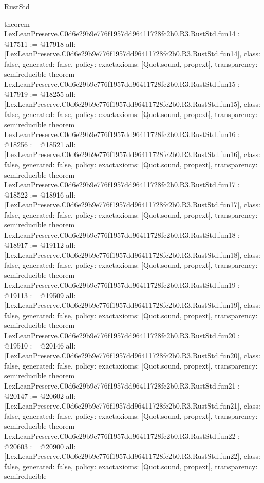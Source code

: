 \begin{lexlean}{RustStd}
\begin{coremodule}
{}
theorem LexLeanPreserve.C0d6e29b9e776f1957dd96411728fc2b0.R3.RustStd.fun14 : @17511 := @17918 {
  all: [LexLeanPreserve.C0d6e29b9e776f1957dd96411728fc2b0.R3.RustStd.fun14],
  class: false,
  generated: false,
  policy: exact{axioms: [Quot.sound, propext]},
  transparency: semireducible
}
theorem LexLeanPreserve.C0d6e29b9e776f1957dd96411728fc2b0.R3.RustStd.fun15 : @17919 := @18255 {
  all: [LexLeanPreserve.C0d6e29b9e776f1957dd96411728fc2b0.R3.RustStd.fun15],
  class: false,
  generated: false,
  policy: exact{axioms: [Quot.sound, propext]},
  transparency: semireducible
}
theorem LexLeanPreserve.C0d6e29b9e776f1957dd96411728fc2b0.R3.RustStd.fun16 : @18256 := @18521 {
  all: [LexLeanPreserve.C0d6e29b9e776f1957dd96411728fc2b0.R3.RustStd.fun16],
  class: false,
  generated: false,
  policy: exact{axioms: [Quot.sound, propext]},
  transparency: semireducible
}
theorem LexLeanPreserve.C0d6e29b9e776f1957dd96411728fc2b0.R3.RustStd.fun17 : @18522 := @18916 {
  all: [LexLeanPreserve.C0d6e29b9e776f1957dd96411728fc2b0.R3.RustStd.fun17],
  class: false,
  generated: false,
  policy: exact{axioms: [Quot.sound, propext]},
  transparency: semireducible
}
theorem LexLeanPreserve.C0d6e29b9e776f1957dd96411728fc2b0.R3.RustStd.fun18 : @18917 := @19112 {
  all: [LexLeanPreserve.C0d6e29b9e776f1957dd96411728fc2b0.R3.RustStd.fun18],
  class: false,
  generated: false,
  policy: exact{axioms: [Quot.sound, propext]},
  transparency: semireducible
}
theorem LexLeanPreserve.C0d6e29b9e776f1957dd96411728fc2b0.R3.RustStd.fun19 : @19113 := @19509 {
  all: [LexLeanPreserve.C0d6e29b9e776f1957dd96411728fc2b0.R3.RustStd.fun19],
  class: false,
  generated: false,
  policy: exact{axioms: [Quot.sound, propext]},
  transparency: semireducible
}
theorem LexLeanPreserve.C0d6e29b9e776f1957dd96411728fc2b0.R3.RustStd.fun20 : @19510 := @20146 {
  all: [LexLeanPreserve.C0d6e29b9e776f1957dd96411728fc2b0.R3.RustStd.fun20],
  class: false,
  generated: false,
  policy: exact{axioms: [Quot.sound, propext]},
  transparency: semireducible
}
theorem LexLeanPreserve.C0d6e29b9e776f1957dd96411728fc2b0.R3.RustStd.fun21 : @20147 := @20602 {
  all: [LexLeanPreserve.C0d6e29b9e776f1957dd96411728fc2b0.R3.RustStd.fun21],
  class: false,
  generated: false,
  policy: exact{axioms: [Quot.sound, propext]},
  transparency: semireducible
}
theorem LexLeanPreserve.C0d6e29b9e776f1957dd96411728fc2b0.R3.RustStd.fun22 : @20603 := @20900 {
  all: [LexLeanPreserve.C0d6e29b9e776f1957dd96411728fc2b0.R3.RustStd.fun22],
  class: false,
  generated: false,
  policy: exact{axioms: [Quot.sound, propext]},
  transparency: semireducible
}
\end{coremodule}
\end{lexlean}
